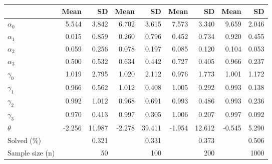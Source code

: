
\begin{tabular}[t]{lrrrrrrrr}
\toprule
  & Mean & SD & Mean  & SD  & Mean   & SD   & Mean    & SD   \\
\midrule
$\alpha_{0}$ & 5.544 & 3.842 & 6.702 & 3.615 & 7.573 & 3.340 & 9.659 & 2.046\\
$\alpha_{1}$ & 0.015 & 0.859 & 0.260 & 0.796 & 0.452 & 0.734 & 0.920 & 0.455\\
$\alpha_{2}$ & 0.059 & 0.256 & 0.078 & 0.197 & 0.085 & 0.120 & 0.104 & 0.053\\
$\alpha_{3}$ & 0.500 & 0.532 & 0.634 & 0.442 & 0.727 & 0.405 & 0.966 & 0.237\\
$\gamma_{0}$ & 1.019 & 2.795 & 1.020 & 2.112 & 0.976 & 1.773 & 1.001 & 1.172\\
$\gamma_{1}$ & 0.966 & 0.562 & 1.012 & 0.408 & 1.005 & 0.292 & 0.993 & 0.138\\
$\gamma_{2}$ & 0.992 & 1.012 & 0.968 & 0.691 & 0.993 & 0.486 & 0.993 & 0.236\\
$\gamma_{3}$ & 0.970 & 0.413 & 0.997 & 0.305 & 1.006 & 0.207 & 0.997 & 0.092\\
$\theta$ & -2.256 & 11.987 & -2.278 & 39.411 & -1.954 & 12.612 & -0.545 & 5.290\\
Solved (\%) &  & 0.321 &  & 0.331 &  & 0.373 &  & 0.506\\
Sample size (n) &  & 50 &  & 100 &  & 200 &  & 1000\\
\bottomrule
\end{tabular}
